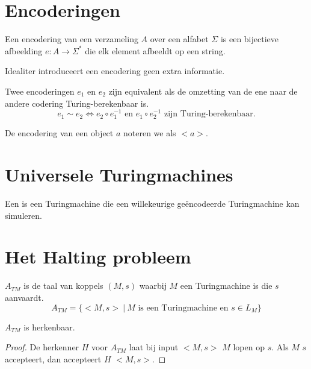 \documentclass[main.tex]{subfiles}
\begin{document}

\section{Encoderingen}
\label{sec:encoderingen}

\begin{de}
  Een encodering van een verzameling $A$ over een alfabet $\Sigma$ is een bijectieve afbeelding $e: A \rightarrow \Sigma^{*}$ die elk element afbeeldt op een string.
\end{de}

\begin{opm}
  Idealiter introduceert een encodering geen extra informatie.
\end{opm}

\begin{de}
  Twee encoderingen $e_{1}$ en $e_{2}$ zijn equivalent als de omzetting van de ene naar de andere codering Turing-berekenbaar is.
  \[ e_{1} \sim e_{2} \Leftrightarrow e_{2} \circ e_{1}^{-1} \text{ en } e_{1} \circ e_{2}^{-1} \text{ zijn Turing-berekenbaar.}\]
\end{de}

\begin{de}
  De encodering van een object $a$ noteren we als $<a>$.
\end{de}

\section{Universele Turingmachines}
\label{sec:univ-turingm}

\begin{de}
  Een  is een Turingmachine die een willekeurige ge\"encodeerde Turingmachine kan simuleren.
\end{de}

\section{Het Halting probleem}
\label{sec:het-halting-probleem}

\begin{de}
  \label{de:a-tm}
  $A_{TM}$ is de taal van koppels $(M,s)$ waarbij $M$ een Turingmachine is die $s$ aanvaardt.
  \[ A_{TM} = \{ <M,s> \ |\ M \text{ is een Turingmachine en } s \in L_{M} \} \]
\end{de}

\begin{st}
  \label{st:a-tm-herk}
  $A_{TM}$ is herkenbaar.
  \begin{proof}
    De herkenner $H$ voor $A_{TM}$ laat bij input $<M,s>$ $M$ lopen op $s$.
    Als $M$ $s$ accepteert, dan accepteert $H$ $<M,s>$.
  \end{proof}
\end{st}
\end{document}
